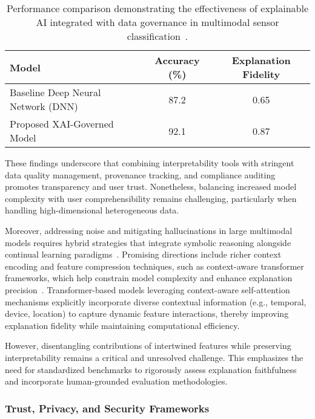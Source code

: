 \documentclass[sigconf]{acmart}
\begin{document}
\begin{table*}[htbp]
\centering
\caption{Performance comparison demonstrating the effectiveness of explainable AI integrated with data governance in multimodal sensor classification~\cite{ref25}.}
\label{table:xai_governance_performance}
\begin{adjustbox}{max width=\textwidth}
\begin{tabular}{@{}lcc@{}}
\toprule
Model                             & Accuracy (\%) & Explanation Fidelity \\ \midrule
Baseline Deep Neural Network (DNN) & 87.2          & 0.65                 \\
Proposed XAI-Governed Model       & 92.1          & 0.87                 \\ \bottomrule
\end{tabular}
\end{adjustbox}
\end{table*}

These findings underscore that combining interpretability tools with stringent data quality management, provenance tracking, and compliance auditing promotes transparency and user trust. Nonetheless, balancing increased model complexity with user comprehensibility remains challenging, particularly when handling high-dimensional heterogeneous data.

Moreover, addressing noise and mitigating hallucinations in large multimodal models requires hybrid strategies that integrate symbolic reasoning alongside continual learning paradigms~\cite{ref13,ref24,ref25}. Promising directions include richer context encoding and feature compression techniques, such as context-aware transformer frameworks, which help constrain model complexity and enhance explanation precision~\cite{ref17}. Transformer-based models leveraging context-aware self-attention mechanisms explicitly incorporate diverse contextual information (e.g., temporal, device, location) to capture dynamic feature interactions, thereby improving explanation fidelity while maintaining computational efficiency.

However, disentangling contributions of intertwined features while preserving interpretability remains a critical and unresolved challenge. This emphasizes the need for standardized benchmarks to rigorously assess explanation faithfulness and incorporate human-grounded evaluation methodologies.

\subsubsection{Trust, Privacy, and Security Frameworks}
\end{document}
